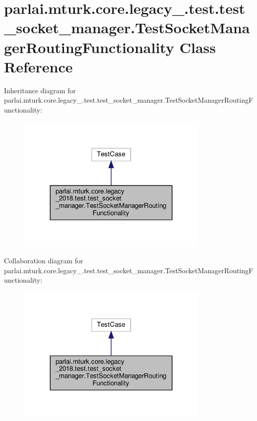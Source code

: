\hypertarget{classparlai_1_1mturk_1_1core_1_1legacy__2018_1_1test_1_1test__socket__manager_1_1TestSocketManagerRoutingFunctionality}{}\section{parlai.\+mturk.\+core.\+legacy\+\_.\+test.\+test\+\_\+socket\+\_\+manager.\+Test\+Socket\+Manager\+Routing\+Functionality Class Reference}
\label{classparlai_1_1mturk_1_1core_1_1legacy__2018_1_1test_1_1test__socket__manager_1_1TestSocketManagerRoutingFunctionality}


Inheritance diagram for parlai.\+mturk.\+core.\+legacy\+\_.\+test.\+test\+\_\+socket\+\_\+manager.\+Test\+Socket\+Manager\+Routing\+Functionality\+:\nopagebreak
\begin{figure}[H]
\begin{center}
\leavevmode
\includegraphics[width=264pt]{d4/df3/classparlai_1_1mturk_1_1core_1_1legacy__2018_1_1test_1_1test__socket__manager_1_1TestSocketManag86b85ab3da5b3f6830a9f736498e595a}
\end{center}
\end{figure}


Collaboration diagram for parlai.\+mturk.\+core.\+legacy\+\_.\+test.\+test\+\_\+socket\+\_\+manager.\+Test\+Socket\+Manager\+Routing\+Functionality\+:\nopagebreak
\begin{figure}[H]
\begin{center}
\leavevmode
\includegraphics[width=264pt]{da/dbb/classparlai_1_1mturk_1_1core_1_1legacy__2018_1_1test_1_1test__socket__manager_1_1TestSocketManag3135cdcbf4129eb3031822e48e2e6e3c}
\end{center}
\end{figure}
